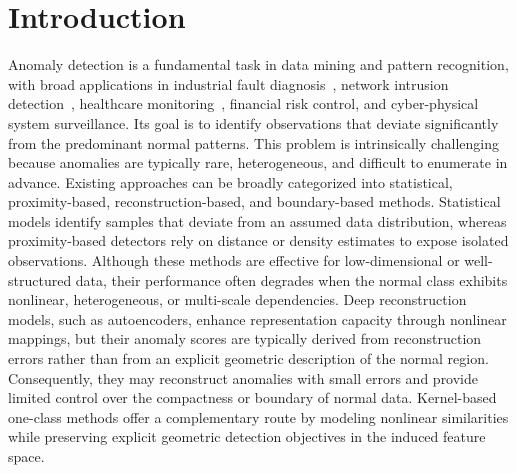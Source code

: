 \documentclass[times, review, 10pt]{elsarticle}
\begin{document}

\section{Introduction}
\label{sec:intro}


Anomaly detection is a fundamental task in data mining and pattern recognition, with broad 
applications in industrial fault diagnosis~\cite{chen2024coarse}, network intrusion detection~\cite{xie2021network}, 
healthcare monitoring~\cite{du2025fraud}, financial risk control, and cyber-physical system surveillance. 
Its goal is to identify observations that deviate significantly from the predominant normal patterns. This 
problem is intrinsically challenging because anomalies are typically rare, heterogeneous, and difficult to 
enumerate in advance. 
Existing approaches can be broadly categorized into statistical, proximity-based, reconstruction-based, and boundary-based methods. 
Statistical models identify samples that deviate from an assumed data distribution, whereas proximity-based detectors rely on 
distance or density estimates to expose isolated observations. Although these methods are effective for low-dimensional or 
well-structured data, their performance often degrades when the normal class exhibits nonlinear, heterogeneous, or multi-scale 
dependencies. Deep reconstruction models, such as autoencoders, enhance representation capacity through nonlinear mappings, 
but their anomaly scores are typically derived from reconstruction errors rather than from an explicit geometric description of 
the normal region. Consequently, they may reconstruct anomalies with small errors and provide limited control over the compactness 
or boundary of normal data. Kernel-based one-class methods offer a complementary route by modeling nonlinear similarities while 
preserving explicit geometric detection objectives in the induced feature space.
\end{document}
